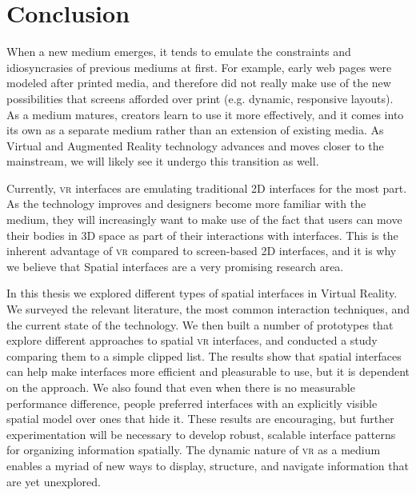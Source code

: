 \documentclass[nobib]{tufte-book} %
\begin{document}

\chapter{Conclusion}
\label{ch:conclusion}

When a new medium emerges, it tends to emulate the constraints and idiosyncrasies of previous mediums at first. For example, early web pages were modeled after printed media, and therefore did not really make use of the new possibilities that screens afforded over print (e.g. dynamic, responsive layouts). As a medium matures, creators learn to use it more effectively, and it comes into its own as a separate medium rather than an extension of existing media. As Virtual and Augmented Reality technology advances and moves closer to the mainstream, we will likely see it undergo this transition as well.

Currently, \textsc{vr} interfaces are emulating traditional 2D interfaces for the most part. As the technology improves and designers become more familiar with the medium, they will increasingly want to make use of the fact that users can move their bodies in 3D space as part of their interactions with interfaces. This is the inherent advantage of \textsc{vr} compared to screen-based 2D interfaces, and it is why we believe that Spatial interfaces are a very promising research area.

In this thesis we explored different types of spatial interfaces in Virtual Reality. We surveyed the relevant literature, the most common interaction techniques, and the current state of the technology. We then built a number of prototypes that explore different approaches to spatial \textsc{vr} interfaces, and conducted a study comparing them to a simple clipped list. The results show that spatial interfaces can help make interfaces more efficient and pleasurable to use, but it is dependent on the approach. We also found that even when there is no measurable performance difference, people preferred interfaces with an explicitly visible spatial model over ones that hide it. These results are encouraging, but further experimentation will be necessary to develop robust, scalable interface patterns for organizing information spatially. The dynamic nature of \textsc{vr} as a medium enables a myriad of new ways to display, structure, and navigate information that are yet unexplored.
\end{document}
